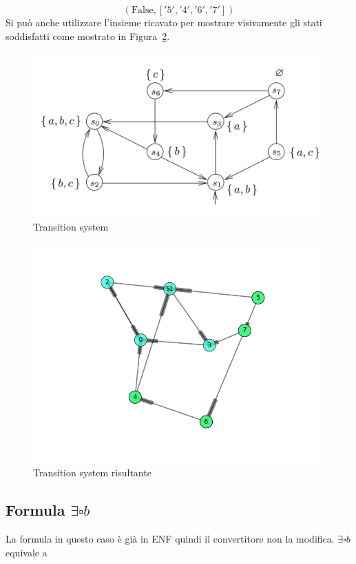 \documentclass[a4paper, 10pt]{article}
\numberwithin{equation}{theor}
\begin{document}
$$(\text{False}, ['5', '4', '6', '7'])$$
Si può anche utilizzare l'insieme ricavato per mostrare visivamente gli stati soddisfatti come mostrato in Figura~\ref{tsResult1}.
\begin{figure}
  \includegraphics[width=\linewidth]{img/ts.png}
  \caption{Transition system}
  \label{ts6}
\end{figure}
\begin{figure}
  \includegraphics[width=\linewidth]{img/tsResult.png}
  \caption{Transition system risultante}
  \label{tsResult1}
\end{figure}

\subsection{Formula $ \exists \square b$}
La formula in questo caso è già in \ac{ENF} quindi il convertitore non la modifica.
$ \exists \square b$ equivale a
\end{document}
